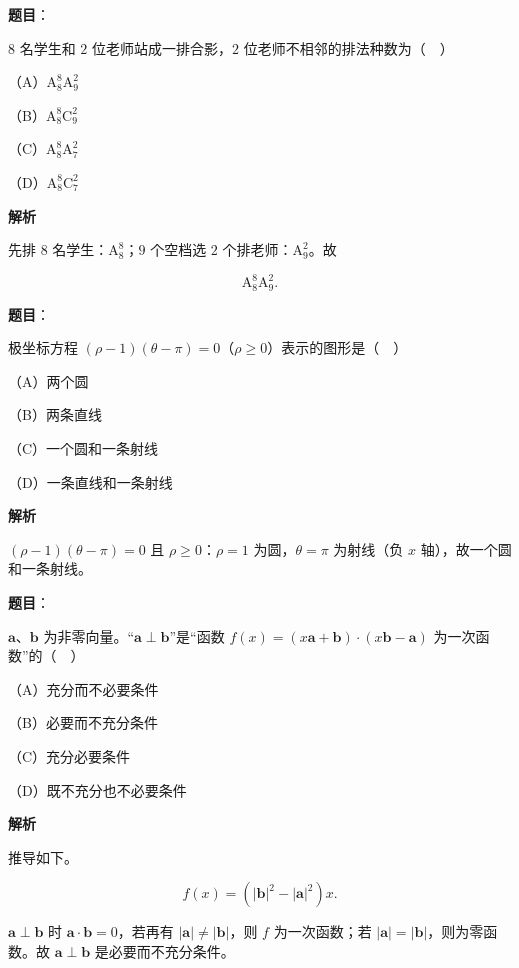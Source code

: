 \begin{answer}

\textbf{题目}：

$8$ 名学生和 $2$ 位老师站成一排合影，$2$ 位老师不相邻的排法种数为（　）

（A）$\mathrm A_8^8\mathrm A_9^2$

（B）$\mathrm A_8^8\mathrm C_9^2$

（C）$\mathrm A_8^8\mathrm A_7^2$

（D）$\mathrm A_8^8\mathrm C_7^2$

\textbf{解析}

先排 $8$ 名学生：$\mathrm A_8^8$；$9$ 个空档选 $2$ 个排老师：$\mathrm A_9^2$。故

\nopagebreak[4]
\[\mathrm A_8^8\mathrm A_9^2.\]


\end{answer}
\begin{answer}

\textbf{题目}：

极坐标方程 $(\rho-1)(\theta-\pi)=0$（$\rho\geqslant0$）表示的图形是（　）

（A）两个圆

（B）两条直线

（C）一个圆和一条射线

（D）一条直线和一条射线

\textbf{解析}

$(\rho-1)(\theta-\pi)=0$ 且 $\rho\geqslant0$：$\rho=1$ 为圆，$\theta=\pi$ 为射线（负 $x$ 轴），故一个圆和一条射线。


\end{answer}
\begin{answer}

\textbf{题目}：

$\boldsymbol a$、$\boldsymbol b$ 为非零向量。“$\boldsymbol a\perp\boldsymbol b$”是“函数 $f(x)=(x\boldsymbol a+\boldsymbol b)\cdot(x\boldsymbol b-\boldsymbol a)$ 为一次函数”的（　）

（A）充分而不必要条件

（B）必要而不充分条件

（C）充分必要条件

（D）既不充分也不必要条件

\textbf{解析}

推导如下。

\nopagebreak[4]
\[f(x)=(|\boldsymbol b|^2-|\boldsymbol a|^2)x.\]

$\boldsymbol a\perp\boldsymbol b$ 时 $\boldsymbol a\cdot\boldsymbol b=0$，若再有 $|\boldsymbol a|\neq|\boldsymbol b|$，则 $f$ 为一次函数；若 $|\boldsymbol a|=|\boldsymbol b|$，则为零函数。故 $\boldsymbol a\perp\boldsymbol b$ 是必要而不充分条件。


\end{answer}
